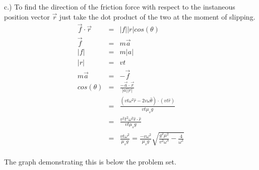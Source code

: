 \documentclass[11pt]{amsart}
\begin{document}
c.) To find the direction of the friction force with respect to the instaneous position vector $\vec{r}$ just take the dot product of the two at the moment of slipping.\\ 
\begin{eqnarray*} 
\vec{f}\cdot\vec{r} &=& |f||r|cos(\theta) \\
\vec{f} &=& m\vec{a} \\
|f| &=& m|a| \\
|r| &=& vt \\
m\vec{a} &=& -\vec{f} \\
cos(\theta) &=& \frac{-\vec{a}\cdot\vec{r}}{|a||r|}  \\
&=& \frac{(vt\omega^{2}\hat{r}-2v\omega\hat{\theta})\cdot(vt\hat{r})}{vt\mu_{s}g} \\
&=& \frac{v^{2}t^{2}\omega^{2}\hat{r}\cdot\hat{r}}{vt\mu_{s}g} \\
&=& \frac{vt\omega^{2}}{\mu_{s}g} = \frac{-v\omega^{2}}{\mu_{s}g}\sqrt{\frac{g^{2}\mu^{2}}{v^{2}\omega^{4}}-\frac{4}{\omega^{2}}} 
\end{eqnarray*} \\
The graph demonstrating this is below the problem set. \\ \\
\end{document}
